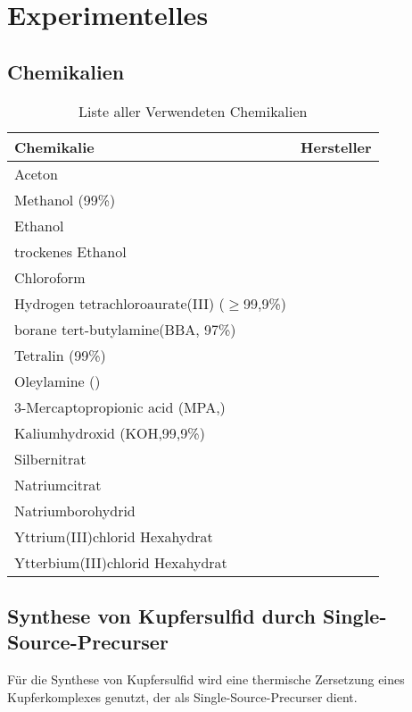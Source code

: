 \section{Experimentelles}
	\subsection{Chemikalien}
		\begin{table}[H]
			\centering
			\caption{Liste aller Verwendeten Chemikalien}
			\label{tab:Chemikalien}
			\begin{tabular}{ll}
				\toprule
				Chemikalie & Hersteller \\
				\midrule
				Aceton&\\
				Methanol (99\%)&\\
				Ethanol&\\
				trockenes Ethanol&\\
				Chloroform&\\
				Hydrogen tetrachloroaurate(III) ($\geq$99,9\%) & \\ 
				borane tert-butylamine(BBA, 97\%) &\\
				Tetralin (99\%)&\\
				Oleylamine ()&\\
				3-Mercaptopropionic acid (MPA,)&\\
				Kaliumhydroxid (KOH,99,9\%)&\\
				Silbernitrat&\\
				Natriumcitrat&\\
				Natriumborohydrid&\\
				Yttrium(III)chlorid Hexahydrat&\\
				Ytterbium(III)chlorid Hexahydrat&\\
				\bottomrule
			\end{tabular}
		\end{table}
	
	\subsection{Synthese von Kupfersulfid durch Single-Source-Precurser}
	Für die Synthese von Kupfersulfid wird eine thermische Zersetzung eines Kupferkomplexes genutzt, der als Single-Source-Precurser dient. \autocite{JenLaPlante2010}
